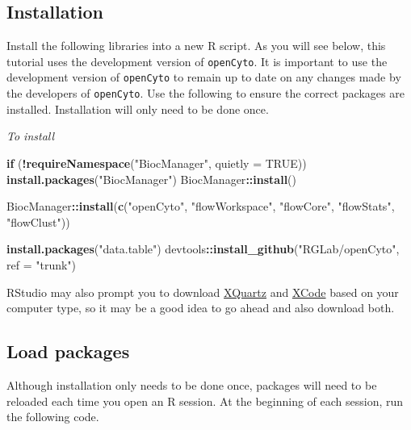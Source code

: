 \documentclass[]{book}
\newenvironment{Shaded}{\begin{snugshade}}{\end{snugshade}}
\newcommand{\ControlFlowTok}[1]{\textcolor[rgb]{0.13,0.29,0.53}{\textbf{#1}}}
\newcommand{\DataTypeTok}[1]{\textcolor[rgb]{0.13,0.29,0.53}{#1}}
\newcommand{\KeywordTok}[1]{\textcolor[rgb]{0.13,0.29,0.53}{\textbf{#1}}}
\newcommand{\NormalTok}[1]{#1}
\newcommand{\OperatorTok}[1]{\textcolor[rgb]{0.81,0.36,0.00}{\textbf{#1}}}
\newcommand{\OtherTok}[1]{\textcolor[rgb]{0.56,0.35,0.01}{#1}}
\newcommand{\StringTok}[1]{\textcolor[rgb]{0.31,0.60,0.02}{#1}}
\begin{document}
\hypertarget{installation}{%
\subsection{Installation}\label{installation}}

Install the following libraries into a new R script. As you will see below, this tutorial uses the development version of \texttt{openCyto}. It is important to use the development version of \texttt{openCyto} to remain up to date on any changes made by the developers of \texttt{openCyto}. Use the following to ensure the correct packages are installed. Installation will only need to be done once.

\emph{To install}

\begin{Shaded}
\begin{Highlighting}[]
\ControlFlowTok{if}\NormalTok{ (}\OperatorTok{!}\KeywordTok{requireNamespace}\NormalTok{(}\StringTok{"BiocManager"}\NormalTok{, }\DataTypeTok{quietly =} \OtherTok{TRUE}\NormalTok{))}
    \KeywordTok{install.packages}\NormalTok{(}\StringTok{"BiocManager"}\NormalTok{)}
\NormalTok{BiocManager}\OperatorTok{::}\KeywordTok{install}\NormalTok{() }

\NormalTok{BiocManager}\OperatorTok{::}\KeywordTok{install}\NormalTok{(}\KeywordTok{c}\NormalTok{(}\StringTok{"openCyto"}\NormalTok{, }\StringTok{"flowWorkspace"}\NormalTok{, }\StringTok{"flowCore"}\NormalTok{,}
                       \StringTok{"flowStats"}\NormalTok{, }\StringTok{"flowClust"}\NormalTok{))}

\KeywordTok{install.packages}\NormalTok{(}\StringTok{"data.table"}\NormalTok{)}
\NormalTok{devtools}\OperatorTok{::}\KeywordTok{install_github}\NormalTok{(}\StringTok{"RGLab/openCyto"}\NormalTok{, }\DataTypeTok{ref =} \StringTok{"trunk"}\NormalTok{)}
\end{Highlighting}
\end{Shaded}

RStudio may also prompt you to download \href{https://www.xquartz.org/}{XQuartz} and \href{https://developer.apple.com/xcode/}{XCode} based on your computer type, so it may be a good idea to go ahead and also download both.

\hypertarget{load-packages}{%
\subsection{Load packages}\label{load-packages}}

Although installation only needs to be done once, packages will need to be reloaded each time you open an R session. At the beginning of each session, run the following code.
\end{document}

